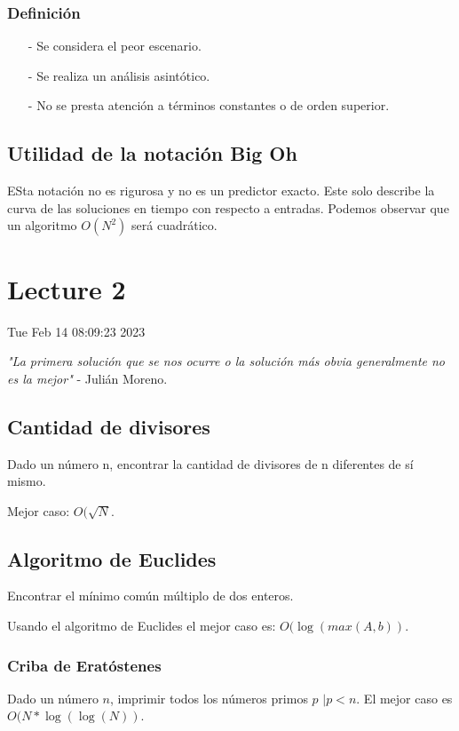\documentclass{article}
\theoremstyle{definition}
\begin{document}
\begin{flushleft}
\subsubsection{Definición}

\begin{itemize}

  \item[-] Se considera el peor escenario.
  \item[-] Se realiza un análisis asintótico.
  \item[-] No se presta atención a términos constantes o de orden superior.

\end{itemize}

\subsection{Utilidad de la notación Big Oh}
ESta notación no es rigurosa y no es un predictor exacto. Este solo describe
la curva de las soluciones en tiempo con respecto a entradas.
Podemos observar que un algoritmo $O(N^2)$ será cuadrático.

\newpage

\section{Lecture 2}

Tue Feb 14 08:09:23 2023

\textit{"La primera solución que se nos ocurre o la solución más obvia 
generalmente no es la mejor"}
  - Julián Moreno.

\subsection{Cantidad de divisores}
Dado un número n, encontrar la cantidad de divisores de n diferentes de sí 
mismo.

Mejor caso: $O(\sqrt{N}$.

\subsection{Algoritmo de Euclides}
Encontrar el mínimo común múltiplo de dos enteros.

Usando el algoritmo de Euclides el mejor caso es: $O(\log(max(A,b))$.

\subsubsection{Criba de Eratóstenes}
Dado un número $n$, imprimir todos los números primos $p$  $| p < n$. El mejor 
caso es $O(N * \log(\log(N))$.


\end{flushleft}
\end{document}
